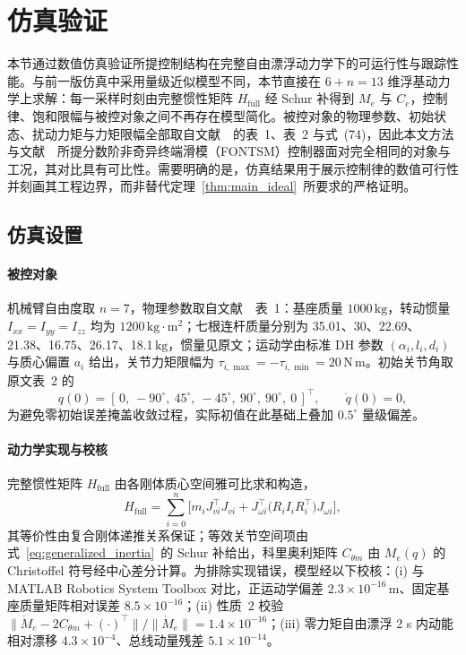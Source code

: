 \section{仿真验证}
\label{sec:simulation}

本节通过数值仿真验证所提控制结构在完整自由漂浮动力学下的可运行性与跟踪性能。与前一版仿真中采用量级近似模型不同，本节直接在 \(6+n=13\) 维浮基动力学上求解：每一采样时刻由完整惯性矩阵 \(H_{\text{full}}\) 经 Schur 补得到 \(M_e\) 与 \(C_e\)，控制律、饱和限幅与被控对象之间不再存在模型简化。被控对象的物理参数、初始状态、扰动力矩与力矩限幅全部取自文献~\cite{dou2025fractional}~的表~1、表~2 与式~(74)，因此本文方法与文献~\cite{dou2025fractional}~所提分数阶非奇异终端滑模（FONTSM）控制器面对完全相同的对象与工况，其对比具有可比性。需要明确的是，仿真结果用于展示控制律的数值可行性并刻画其工程边界，而非替代定理~\ref{thm:main_ideal}~所要求的严格证明。

\subsection{仿真设置}

\paragraph{被控对象}
机械臂自由度取 \(n=7\)，物理参数取自文献~\cite{dou2025fractional}~表~1：基座质量 \(1000\,\mathrm{kg}\)，转动惯量 \(I_{xx}=I_{yy}=I_{zz}\) 均为 \(1200\,\mathrm{kg\cdot m^2}\)；七根连杆质量分别为 35.01、30、22.69、21.38、16.75、26.17、18.1\,\(\mathrm{kg}\)，惯量见原文；运动学由标准 DH 参数 \((\alpha_i,l_i,d_i)\) 与质心偏置 \(a_i\) 给出，关节力矩限幅为 \(\tau_{i,\max}=-\tau_{i,\min}=20\,\mathrm{N\,m}\)。初始关节角取原文表~2 的
\[
q(0)=[\,0,\ -90^\circ,\ 45^\circ,\ -45^\circ,\ 90^\circ,\ 90^\circ,\ 0\,]^\top ,\qquad \dot q(0)=0 ,
\]
为避免零初始误差掩盖收敛过程，实际初值在此基础上叠加 \(0.5^\circ\) 量级偏差。

\paragraph{动力学实现与校核}
完整惯性矩阵 \(H_{\text{full}}\) 由各刚体质心空间雅可比求和构造，
\[
H_{\text{full}}=\sum_{i=0}^{n}\bigl[m_i J_{vi}^\top J_{vi}+J_{\omega i}^\top \bigl(R_i I_i R_i^\top\bigr) J_{\omega i}\bigr],
\]
其等价性由复合刚体递推关系保证；等效关节空间项由式~\eqref{eq:generalized_inertia}~的 Schur 补给出，科里奥利矩阵 \(C_{\theta m}\) 由 \(M_e(q)\) 的 Christoffel 符号经中心差分计算。为排除实现错误，模型经以下校核：(i) 与 MATLAB Robotics System Toolbox 对比，正运动学偏差 \(2.3\times10^{-16}\,\mathrm{m}\)、固定基座质量矩阵相对误差 \(8.5\times10^{-16}\)；(ii) 性质~2 校验 \(\|\dot M_e-2C_{\theta m}+(\cdot)^\top\|/\|\dot M_e\|=1.4\times10^{-16}\)；(iii) 零力矩自由漂浮 2 s 内动能相对漂移 \(4.3\times10^{-4}\)、总线动量残差 \(5.1\times10^{-14}\)。

